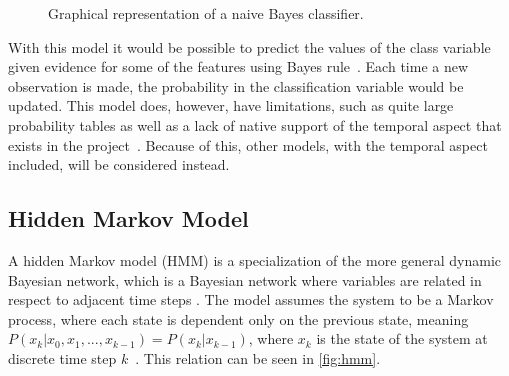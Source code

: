 \begin{figure}[H]
\begin{center}
\end{center}
\caption{Graphical representation of a naive Bayes classifier.}
\label{fig:bayes_classifier}
\end{figure}

With this model it would be possible to predict the values of the class variable given evidence for some of the features using Bayes rule~\cite{poole2010artificial}. Each time a new observation is made, the probability in the classification variable would be updated. This model does, however, have limitations, such as quite large probability tables as well as a lack of native support of the temporal aspect that exists in the project~\cite{poole2010artificial}. Because of this, other models, with the temporal aspect included, will be considered instead.

\subsection{Hidden Markov Model} \label{ss:hmm}
A hidden Markov model (HMM) is a specialization of the more general dynamic Bayesian network, which is a Bayesian network where variables are related in respect to adjacent time steps \cite{poole2010artificial}. The model assumes the system to be a Markov process, where each state is dependent only on the previous state, meaning $P(x_k | x_0,x_1,...,x_{k-1}) = P(x_k | x_{k-1})$, where $x_k$ is the state of the system at discrete time step $k$~\cite{poole2010artificial}. This relation can be seen in \cref{fig:hmm}. 

